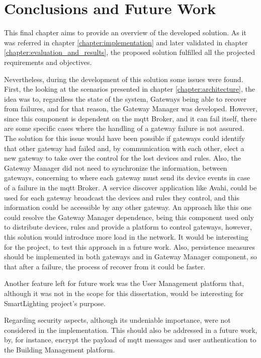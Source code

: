 \chapter{Conclusions and Future Work}
\label{chapter:conclusions}

This final chapter aims to provide an overview of the developed solution. As it was referred in chapter \ref{chapter:implementation} and later validated in chapter \ref{chapter:evaluation_and_results}, the proposed solution fulfilled all the projected requirements and objectives. 

Nevertheless, during the development of this solution some issues were found. First, the looking at the scenarios presented in chapter \ref{chapter:architecture}, the idea was to, regardless the state of the system, Gateways being able to recover from failures, and for that reason, the Gateway Manager was developed. However, since this component is dependent on the \ac{mqtt} Broker, and it can fail itself, there are some specific cases where the handling of a gateway failure is not assured. The solution for this issue would have been possible if gateways could identify that other gateway had failed and, by communication with each other, elect a new gateway to take over the control for the lost devices and rules. Also, the Gateway Manager did not need to synchronize the information, between gateways, concerning to where each gateway must send its device events in case of a failure in the \ac{mqtt} Broker. A service discover application like Avahi, could be used for each gateway broadcast the devices and rules they control, and this information could be accessible by any other gateway. An approach like this one could resolve the Gateway Manager dependence, being this component used only to distribute devices, rules and provide a platform to control gateways, however, this solution would introduce more load in the network. It would be interesting for the project, to test this approach in a future work. Also, persistence measures should be implemented in both gateways and in Gateway Manager component, so that after a failure, the process of recover from it could be faster.

Another feature left for future work was the User Management platform that, although it was not in the scope for this dissertation, would be interesting for SmartLighting project's purpose.

Regarding security aspects, although its undeniable importance, were not considered in the implementation. This should also be addressed in a future work, by, for instance, encrypt the payload of \ac{mqtt} messages and user authentication to the Building Management platform.
